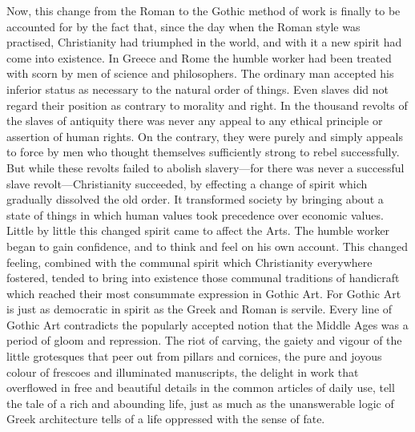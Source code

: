 \documentclass{book}
\begin{document}
Now, this change from the Roman to the Gothic method of work is finally to be accounted for by the fact that, since the day when the Roman style was practised, Christianity had triumphed in the world, and with it a new spirit had come into existence. In Greece and Rome the humble worker had been treated with scorn by men of science and philosophers. The ordinary man accepted his inferior status as necessary to the natural order of things. Even slaves did not regard their position as contrary to morality and right. In the thousand revolts of the slaves of antiquity there was never any appeal to any ethical principle or assertion of human rights. On the contrary, they were purely and simply appeals to force by men who thought themselves sufficiently strong to rebel successfully. But while these revolts failed to abolish slavery—for there was never a successful slave revolt—Christianity succeeded, by effecting a change of spirit which gradually dissolved the old order. It transformed society by bringing about a state of things in which human values took precedence over economic values. Little by little this changed spirit came to affect the Arts. The humble worker began to gain confidence, and to think and feel on his own account. This changed feeling, combined with the communal spirit which Christianity everywhere fostered, tended to bring into existence those communal traditions of handicraft which reached their most consummate expression in Gothic Art. For Gothic Art is just as democratic in spirit as the Greek and Roman is servile. Every line of Gothic Art contradicts the popularly accepted notion that the Middle Ages was a period of gloom and repression. The riot of carving, the gaiety and vigour of the little grotesques that peer out from pillars and cornices, the pure and joyous colour of frescoes and illuminated manuscripts, the delight in work that overflowed in free and beautiful details in the common articles of daily use, tell the tale of a rich and abounding life, just as much as the unanswerable logic of Greek architecture tells of a life oppressed with the sense of fate.
\end{document}
